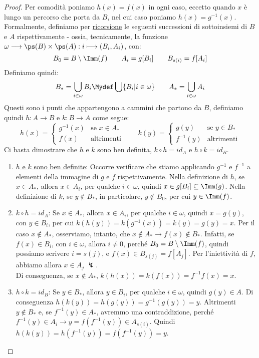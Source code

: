 \documentclass[11pt]{scrartcl}
\begin{document}
\begin{proof}
	Per comodità poniamo $h(x) = f(x)$ in ogni caso, eccetto quando $x$ è lungo un percorso che porta da $B$, nel cui caso poniamo $h(x) = g^{-1}(x)$.\\
	Formalmente, definiamo per \hyperref[ric1]{ricorsione} le seguenti successioni di sottoinsiemi di $B$ e $A$ rispettivamente - ossia, tecnicamente, la funzione $\omega \longrightarrow \ps(B) \times \ps(A) : i \longmapsto (B_i,A_i)$, con:
	\[ B_0 = B \setminus\Imm(f) \qquad A_i = g[B_i] \qquad B_{s(i)} = f[A_i]
		\]
	Definiamo quindi:
	\[ B_* = \bigcup_{i \in \omega}B_i \Mydef \bigcup\{B_i | i \in \omega\} \qquad A_* = \bigcup_{i \in \omega} A_i
		\]
	Questi sono i punti che appartengono a cammini che partono da $B$, definiamo quindi $h : A \longrightarrow B$ e $k : B \longrightarrow A$ come segue:
	\[ h(x) = \begin{cases}
		g^{-1}(x) &\text{se $x \in A_*$}\\
		f(x) &\text{altrimenti}
	\end{cases}
	\qquad
	k(y) = \begin{cases}
		g(y) &\text{se $y \in B_*$}\\
		f^{-1}(y) &\text{altrimenti}
	\end{cases}
		\]
	Ci basta dimostrare che $h$ e $k$ sono ben definita, $k \circ h = id_A$ e $h \circ k = id_B$.
	\begin{enumerate}[(1)]
		\item \underline{$h$ e $k$ sono ben definite}: Occorre verificare che stiamo applicando $g^{-1}$ e $f^{-1}$ a elementi della immagine di $g$ e $f$ rispettivamente.
		Nella definizione di $h$, se $x \in A_*$, allora $x \in A_i$, per qualche $i \in \omega$, quindi $x \in g[B_i] \subseteq \Imm(g)$. Nella definizione di $k$, se $y \not \in B_*$, in particolare,
		$y \not \in B_0$, per cui $y \in \Imm(f)$.
		\item \underline{$k \circ h = id_A$}: Se $x \in A_*$, allora $x \in A_i$, per qualche $i \in \omega$, quindi $x = g(y)$, con $y \in B_i$, per cui $k(h(y)) = k(g^{-1}(x)) = k(y) = g(y) = x$. Per il caso
		$x \not \in A_*$, osserviamo, intanto, che $x \not \in A_* \rightarrow f(x) \not \in B_*$. Infatti, se $f(x) \in B_i$, con $i \in \omega$, allora $i \ne 0$, perché $B_0 = B \setminus \Imm(f)$, quindi possiamo scrivere $i = s(j)$, 
		e $f(x) \in B_{s(j)} = f[A_j]$. Per l'iniettività di $f$, abbiamo allora $x \in A_j \;\lightning$.\\
		Di conseguenza, se $x \not \in A_*$, $k(h(x)) = k(f(x)) = f^{-1}f(x) = x$.
		\item \underline{$h \circ k = id_B$}: Se $y \in B_*$, allora $y \in B_i$, per qualche $i \in \omega$, quindi $g(y) \in A$. Di conseguenza $h(k(y)) = h(g(y)) = g^{-1}(g(y)) = y$. Altrimenti $y \not \in B_*$ e, se $f^{-1}(y)\in A_*$, avremmo una contraddizione,
		perché $f^{-1}(y) \in A_i \rightarrow y = f(f^{-1}(y)) \in A_{s(i)}$. Quindi $h(k(y)) = h(f^{-1}(y)) = f(f^{-1}(y)) = y$.
	\end{enumerate}
\end{proof}
\end{document}
